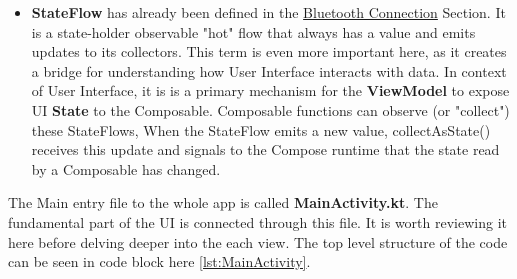 \begin{itemize}
	\item \textbf{StateFlow} has already been defined in the \hyperref[subsec:Bluetooth]{Bluetooth Connection} Section. It is a state-holder observable "hot" flow that always has a value and emits updates to its collectors. This term is even more important here, as it creates a bridge for understanding how User Interface interacts with data. In context of User Interface, it is is a primary mechanism for the \textbf{ViewModel} to expose \ac{UI} \textbf{State} to the Composable. Composable functions can observe (or "collect") these StateFlows, When the StateFlow emits a new value, collectAsState() receives this update and signals to the Compose runtime that the state read by a Composable has changed.
\end{itemize}
The Main entry file to the whole app is called \textbf{MainActivity.kt}. The fundamental part of the \ac{UI} is connected through this file. It is worth reviewing it here before delving deeper into the each view. The top level structure of the code can be seen in code block here \ref{lst:MainActivity}.

